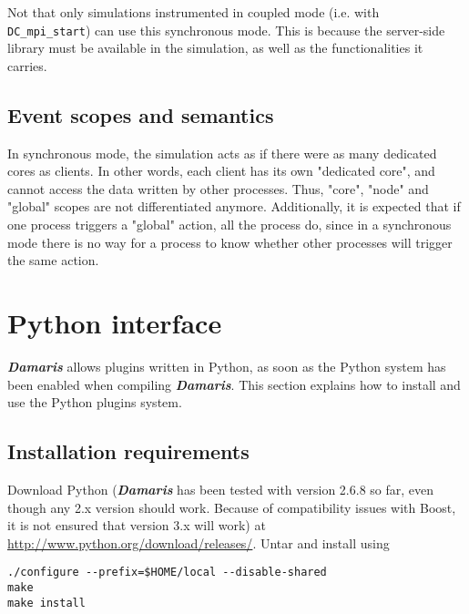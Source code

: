 \documentclass[11pt]{report}
\newcommand{\Damaris}{\emph{\textbf{Damaris}}}
\newcommand{\function}[1]{\texttt{#1}}
\begin{document}
Not that only simulations instrumented in coupled mode (i.e. with \function{DC\_mpi\_start}) 
can use this synchronous mode. This is because the server-side library must be available
in the simulation, as well as the functionalities it carries.

\section{Event scopes and semantics}

In synchronous mode, the simulation acts as if there were as many dedicated cores as clients.
In other words, each client has its own "dedicated core", and cannot access the data 
written by other processes.
Thus, "core", "node" and "global" scopes are not differentiated anymore.
Additionally, it is expected that if one process triggers a "global" action, all the process do,
since in a synchronous mode there is no way for a process to know whether other processes
will trigger the same action.

\chapter{Python interface}\label{Python}

\Damaris{} allows plugins written in Python, as soon as the Python system has been
enabled when compiling \Damaris{}. This section explains how to install and use the Python
plugins system.

\section{Installation requirements}

Download Python (\Damaris{} has been tested with version 2.6.8 so far, even though any 2.x version
should work. Because of compatibility issues with Boost, it is not ensured that version 3.x will work) at 
\url{http://www.python.org/download/releases/}.
Untar and install using
\begin{verbatim}
./configure --prefix=$HOME/local --disable-shared
make
make install
\end{verbatim}
\end{document}
